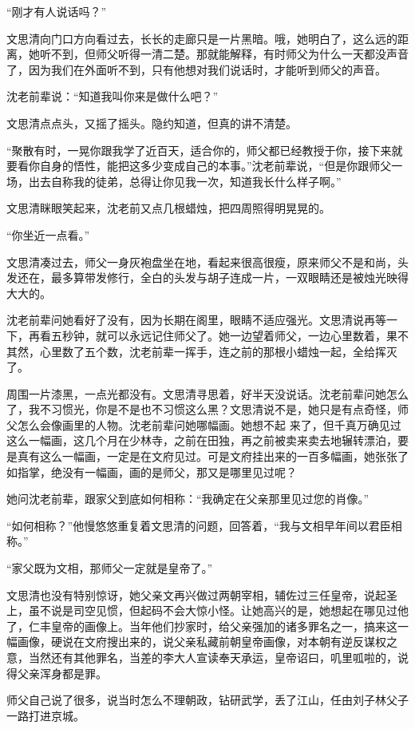 “刚才有人说话吗？”

文思清向门口方向看过去，长长的走廊只是一片黑暗。哦，她明白了，这么远的距离，她听不到，但师父听得一清二楚。那就能解释，有时师父为什么一天都没声音了，因为我们在外面听不到，只有他想对我们说话时，才能听到师父的声音。

沈老前辈说：“知道我叫你来是做什么吧？”

文思清点点头，又摇了摇头。隐约知道，但真的讲不清楚。

“聚散有时，一晃你跟我学了近百天，适合你的，师父都已经教授于你，接下来就要看你自身的悟性，能把这多少变成自己的本事。”沈老前辈说，“但是你跟师父一场，出去自称我的徒弟，总得让你见我一次，知道我长什么样子啊。”

文思清眯眼笑起来，沈老前又点几根蜡烛，把四周照得明晃晃的。

“你坐近一点看。”

文思清凑过去，师父一身灰袍盘坐在地，看起来很高很瘦，原来师父不是和尚，头发还在，最多算带发修行，全白的头发与胡子连成一片，一双眼睛还是被烛光映得大大的。

沈老前辈问她看好了没有，因为长期在阁里，眼睛不适应强光。文思清说再等一下，再看五秒钟，就可以永远记住师父了。她一边望着师父，一边心里数着，果不其然，心里数了五个数，沈老前辈一挥手，连之前的那根小蜡烛一起，全给挥灭了。

周围一片漆黑，一点光都没有。文思清寻思着，好半天没说话。沈老前辈问她怎么了，我不习惯光，你是不是也不习惯这么黑？文思清说不是，她只是有点奇怪，师父怎么会像画里的人物。沈老前辈问她哪幅画。她想不起
来了，但千真万确见过这么一幅画，这几个月在少林寺，之前在田独，再之前被卖来卖去地辗转漂泊，要是真有这么一幅画，一定是在文府见过。可是文府挂出来的一百多幅画，她张张了如指掌，绝没有一幅画，画的是师父，那又是哪里见过呢？

她问沈老前辈，跟家父到底如何相称：“我确定在父亲那里见过您的肖像。”

“如何相称？”他慢悠悠重复着文思清的问题，回答着，“我与文相早年间以君臣相称。”

“家父既为文相，那师父一定就是皇帝了。”

文思清也没有特别惊讶，她父亲文再兴做过两朝宰相，辅佐过三任皇帝，说起圣上，虽不说是司空见惯，但起码不会大惊小怪。让她高兴的是，她想起在哪见过他了，仁丰皇帝的画像上。当年他们抄家时，给父亲强加的诸多罪名之一，搞来这一幅画像，硬说在文府搜出来的，说父亲私藏前朝皇帝画像，对本朝有逆反谋权之意，当然还有其他罪名，当差的李大人宣读奉天承运，皇帝诏曰，叽里呱啦的，说得父亲浑身都是罪。

师父自己说了很多，说当时怎么不理朝政，钻研武学，丢了江山，任由刘子林父子一路打进京城。

